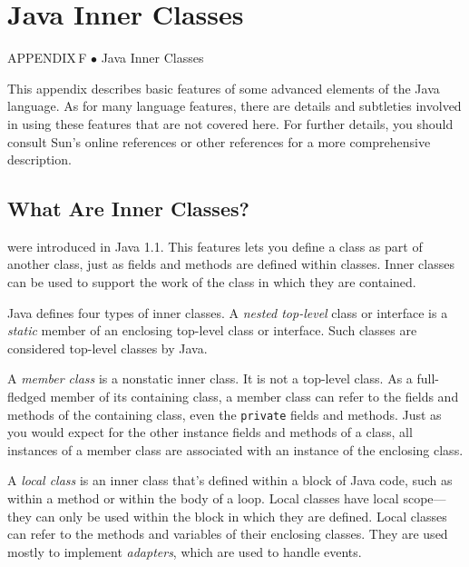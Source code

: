 \setcounter{table}{0}
\setcounter{figure}{0}
\renewcommand{\thetable}{\mbox{F.\arabic{table}}}%
\renewcommand{\thefigure}{\mbox{F--\arabic{figure}}}%

\chapter{Java Inner Classes}

{{\color{cyan}APPENDIX\,F\,\,$\bullet$\,\,}Java Inner Classes}

\noindent This appendix describes basic features of some advanced
elements of the Java language.  As for many language features, there
are details and subtleties involved in using these features that are
not covered here.  For further details, you should consult Sun's online
references or other references for a more comprehensive description.

\section*{What Are Inner Classes?}
 were introduced in Java 1.1. This features lets
you define a class as part of another class, just as fields and
methods are defined within classes.   Inner classes can be used to
support the work of the class in which they are contained.

Java defines four types of inner classes.   A {\it nested top-level}
class or interface is a {\it static} member of an enclosing top-level
class or interface.  Such classes are considered top-level classes
by Java.

A {\it member class} is a nonstatic inner class.  It is not a
top-level class.  As a full-fledged member of its containing class, a
member class can refer to the fields and methods of the containing
class, even the {\tt private} fields and methods.  Just as you would
expect for the other instance fields and methods of a class, all
instances of a member class are associated with an instance of the
enclosing class.

A {\it local class} is an inner class that's defined within a block of
Java code, such as within a method or within the body of a loop.  Local
classes have local scope---they can only be used within the block in
which they are defined.  Local classes can refer to the methods and
variables of their enclosing classes.   They are used mostly to implement
{\it adapters}, which are used to handle events.

